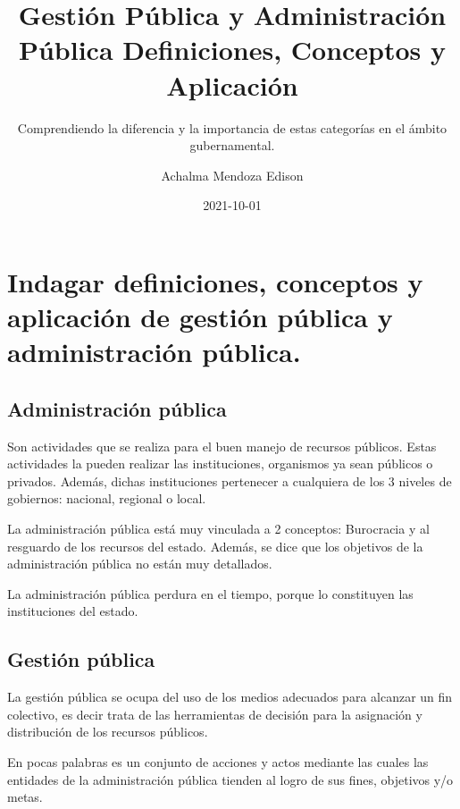 \documentclass[
  letterpaper,
  DIV=11,
  numbers=noendperiod]{scrartcl}
\title{Gestión Pública y Administración Pública Definiciones, Conceptos
y Aplicación}
\subtitle{Comprendiendo la diferencia y la importancia de estas
categorías en el ámbito gubernamental.}
\author{Achalma Mendoza Edison}
\date{2021-10-01}
\begin{document}
\maketitle
\ifdefined\Shaded\renewenvironment{Shaded}{\begin{tcolorbox}[breakable, frame hidden, interior hidden, borderline west={3pt}{0pt}{shadecolor}, boxrule=0pt, sharp corners, enhanced]}{\end{tcolorbox}}\fi

\hypertarget{indagar-definiciones-conceptos-y-aplicaciuxf3n-de-gestiuxf3n-puxfablica-y-administraciuxf3n-puxfablica.}{%
\section{Indagar definiciones, conceptos y aplicación de gestión pública
y administración
pública.}\label{indagar-definiciones-conceptos-y-aplicaciuxf3n-de-gestiuxf3n-puxfablica-y-administraciuxf3n-puxfablica.}}

\hypertarget{administraciuxf3n-puxfablica}{%
\subsection{Administración pública}\label{administraciuxf3n-puxfablica}}

Son actividades que se realiza para el buen manejo de recursos públicos.
Estas actividades la pueden realizar las instituciones, organismos ya
sean públicos o privados. Además, dichas instituciones pertenecer a
cualquiera de los 3 niveles de gobiernos: nacional, regional o local.

La administración pública está muy vinculada a 2 conceptos: Burocracia y
al resguardo de los recursos del estado. Además, se dice que los
objetivos de la administración pública no están muy detallados.

La administración pública perdura en el tiempo, porque lo constituyen
las instituciones del estado.

\hypertarget{gestiuxf3n-puxfablica}{%
\subsection{Gestión pública}\label{gestiuxf3n-puxfablica}}

La gestión pública se ocupa del uso de los medios adecuados para
alcanzar un fin colectivo, es decir trata de las herramientas de
decisión para la asignación y distribución de los recursos públicos.

En pocas palabras es un conjunto de acciones y actos mediante las cuales
las entidades de la administración pública tienden al logro de sus
fines, objetivos y/o metas.
\end{document}
